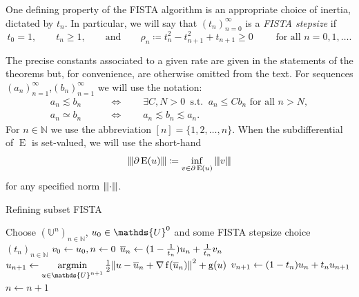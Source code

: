 \documentclass[smallextended]{svjour3}
\let\F\mathds\let\C\mathcal\newcommand{\R}{\F{R}}\newcommand{\A}{\tens{A}}
\newcommand{\norm}[1]{{\left\lVert #1 \right\rVert}}
\newcommand{\Norm}[1]{{\left\vert\kern-0.25ex\left\vert\kern-0.25ex\left\vert #1 \right\vert\kern-0.25ex\right\vert\kern-0.25ex\right\vert}}
\newcommand{\op}[1]{\operatorname{#1}}
\newcommand{\1}{\F{1}}
\DeclareMathOperator{\st}{\;s.t.\;}
\DeclareMathOperator*{\argmin}{argmin}
\newcommand*{\var}[1]{%
	\IfEqCase{#1}{%
		{0}{u}%
		{1}{v}%
		{2}{w}%
	}[u#1]%
}
\begin{document}
	One defining property of the FISTA algorithm is an appropriate choice of inertia, dictated by $t_n$. In particular, we will say that $(t_n)_{n=0}^\infty$ is a \emph{FISTA stepsize} if
	\begin{equation}\label{def: t_n and rho_n}
		t_0 = 1, \qquad t_n \geq 1, \qquad \text{and}\qquad \rho_n \coloneqq t_n^2 - t_{n+1}^2 + t_{n+1} \geq 0\qquad \text{ for all }n=0,1,\ldots.
	\end{equation}
		
	The precise constants associated to a given rate are given in the statements of the theorems but, for convenience, are otherwise omitted from the text. For sequences $(a_n)_{n=1}^\infty$,$(b_n)_{n=1}^\infty$ we will use the notation:
	\begin{align*}
		a_n \lesssim b_n \qquad &\iff \qquad \exists C,N>0 \st a_n \leq C b_n \text{ for all } n>N,
		\\ a_n \simeq b_n \qquad &\iff \qquad a_n\lesssim b_n \lesssim a_n.
	\end{align*}
	For $n\in\F N$ we use the abbreviation $[n] = \{1,2,\ldots,n\}$. When the subdifferential of $\op{E}$ is set-valued, we will use the short-hand
	\begin{equation}
		\Norm{\partial\op{E}(\var0)} \coloneqq \inf_{\var1\in\partial\op{E}(\var0)}\Norm{\var1}
	\end{equation}
	for any specified norm $\Norm\cdot$.
	
	\begin{algorithm}\caption{Refining subset FISTA}\label{alg: refining FISTA}
		\centering
		\begin{algorithmic}[1]
			\State Choose $(\F{U}^n)_{n\in\F N}$, $\var0_0\in \F{U}^0$ and some FISTA stepsize choice $(t_n)_{n\in\F N}$
			\State $\var1_0\gets \var0_0, n\gets0$
			\Repeat
			\State $\bar{\var0}_n \gets (1-\tfrac{1}{t_n})\var0_n + \tfrac{1}{t_n}\var1_n$
			\State $\displaystyle \var0_{n+1} \gets \argmin_{\var0\in \F{U}^{n+1}} \tfrac12\norm{\var0-\bar{\var0}_n+\nabla \op{f}(\bar{\var0}_n)}^2+\op{g}(\var0)$ \Comment{Only modification, $\F{U}^{n+1}\subset \F{U}$}
			\State $\var1_{n+1} \gets (1-t_n)\var0_n + t_n\var0_{n+1}$
			\State $n\gets n+1$
		\end{algorithmic}
	\end{algorithm}
	
	
\end{document}
